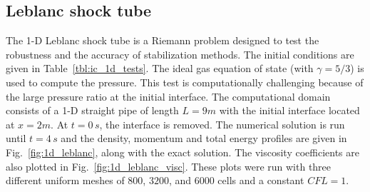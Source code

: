 \documentclass[review,10pt]{elsarticle}
\newcommand{\fig}[1]{Fig.~\ref{#1}}                      %
\newcommand{\tbl}[1]{Table~\ref{#1}}                     %
\begin{document}
\subsection{Leblanc shock tube} \label{sec:Leblanc}

The 1-D Leblanc shock tube is a Riemann problem designed to test the robustness and the accuracy of stabilization methods. 
The initial conditions are given in \tbl{tbl:ic_1d_tests}. The ideal gas equation of state (with $\gamma=5/3$) is used to 
compute the pressure.
This test is computationally challenging because of the large pressure ratio at the initial interface.
The computational domain consists of a 1-D straight pipe of length $L=9m$ with the initial interface located at $x=2m$. 
At $t=0\,s$, the interface is removed. The numerical solution is run until $t=4\,s$ and the density, momentum and 
total energy profiles are given in \fig{fig:1d_leblanc}, along with the exact solution. The viscosity coefficients 
are also plotted in \fig{fig:1d_leblanc_visc}. These plots were run with three different uniform meshes of $800$, 
$3200$, and $6000$ cells and a constant $CFL = 1$.
\end{document}
